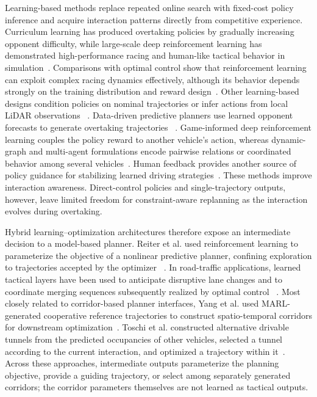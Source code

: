 \documentclass[journal,twoside,web]{ieeecolor}
\begin{document}
Learning-based methods replace repeated online search with fixed-cost policy
inference and acquire interaction patterns directly from competitive
experience. 
Curriculum learning has produced overtaking policies by gradually
increasing opponent difficulty, while large-scale deep reinforcement learning
has demonstrated high-performance racing and human-like tactical behavior in
simulation~\cite{song2021overtaking,fuchs2021superhuman,wurman2022gtsophy}.
Comparisons with optimal control show that reinforcement learning can exploit
complex racing dynamics effectively, although its behavior depends strongly on
the training distribution and reward design~\cite{lin2023limit}. 
Other learning-based designs condition policies on nominal trajectories or
infer actions from local LiDAR observations
~\cite{evans2023trajectory,hell2024lidar}. Data-driven predictive planners use
learned opponent forecasts to generate overtaking trajectories
~\cite{baumann2025predictive}.
Game-informed deep reinforcement learning couples the
policy reward to another vehicle's action, whereas dynamic-graph and
multi-agent formulations encode pairwise relations or coordinated behavior
among several vehicles~\cite{yuan2022drlgame,hu2023dynamicgraph,
han2024marl}. 
Human feedback provides another source of policy guidance for stabilizing
learned driving strategies~\cite{guo2025rlhf}.
These methods improve interaction awareness. Direct-control policies and
single-trajectory outputs, however, leave limited freedom for constraint-aware
replanning as the interaction evolves during overtaking.

Hybrid learning--optimization architectures therefore expose an intermediate
decision to a model-based planner. Reiter et al. used reinforcement learning to
parameterize the objective of a nonlinear predictive planner, confining
exploration to trajectories accepted by the optimizer
~\cite{reiter2023hierarchical}. In road-traffic applications, learned tactical
layers have been used to anticipate disruptive lane changes and to coordinate
merging sequences subsequently realized by optimal control
~\cite{liu2023proactive,muzahid2025merging}. 
Most closely related to corridor-based planner interfaces, Yang et al. used
MARL-generated cooperative reference trajectories to construct spatio-temporal
corridors for downstream optimization~\cite{yang2026corridor}. Toschi et al.
constructed alternative drivable tunnels from the predicted occupancies of
other vehicles, selected a tunnel according to the current interaction, and
optimized a trajectory within it~\cite{toschi2025modular}.
Across these approaches, intermediate outputs parameterize the planning
objective, provide a guiding trajectory, or select among separately generated
corridors; the corridor parameters themselves are not learned as tactical
outputs.
\end{document}

